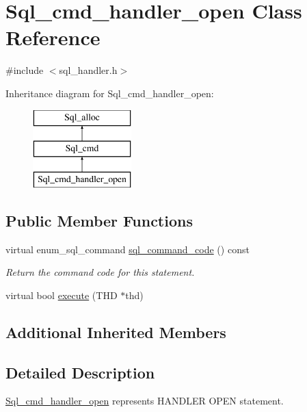 \hypertarget{classSql__cmd__handler__open}{}\section{Sql\+\_\+cmd\+\_\+handler\+\_\+open Class Reference}
\label{classSql__cmd__handler__open}


{\ttfamily \#include $<$sql\+\_\+handler.\+h$>$}

Inheritance diagram for Sql\+\_\+cmd\+\_\+handler\+\_\+open\+:\begin{figure}[H]
\begin{center}
\leavevmode
\includegraphics[height=3.000000cm]{classSql__cmd__handler__open}
\end{center}
\end{figure}
\subsection*{Public Member Functions}
\begin{DoxyCompactItemize}
\item 
\mbox{\label{classSql__cmd__handler__open_a73f96cce2684a0578ebbf11bda58fc7e}} 
virtual enum\+\_\+sql\+\_\+command \mbox{\hyperlink{classSql__cmd__handler__open_a73f96cce2684a0578ebbf11bda58fc7e}{sql\+\_\+command\+\_\+code}} () const
\begin{DoxyCompactList}\small\item\em Return the command code for this statement. \end{DoxyCompactList}\item 
virtual bool \mbox{\hyperlink{classSql__cmd__handler__open_a79b3b42813bdf3d60fd796e149674d55}{execute}} (T\+HD $\ast$thd)
\end{DoxyCompactItemize}
\subsection*{Additional Inherited Members}


\subsection{Detailed Description}
\mbox{\hyperlink{classSql__cmd__handler__open}{Sql\+\_\+cmd\+\_\+handler\+\_\+open}} represents H\+A\+N\+D\+L\+ER O\+P\+EN statement.

